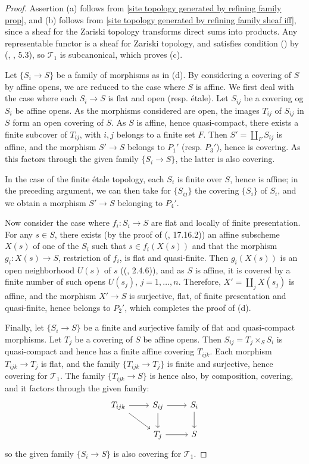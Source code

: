 \begin{proof}
Assertion (a) follows from \cref{site topology generated by refining family prop}, and (b) follows from \cref{site topology generated by refining family sheaf iff}, since a sheaf for the Zariski topology transforms direct sums into products. Any representable functor is a sheaf for Zariski topology, and satisfies condition () by (\cite{SGA1}, , 5.3), so $\mathcal{T}_1$ is subcanonical, which proves (c).\par
Let $\{S_i\to S\}$ be a family of morphisms as in (d). By considering a covering of $S$ by affine opens, we are reduced to the case where $S$ is affine. We first deal with the case where each $S_i\to S$ is flat and open (resp. \'etale). Let $S_{ij}$ be a covering og $S_i$ be affine opens. As the morphisms considered are open, the images $T_{ij}$ of $S_{ij}$ in $S$ form an open covering of $S$. As $S$ is affine, hence quasi-compact, there exists a finite subcover of $T_{ij}$, with $i,j$ belongs to a finite set $F$. Then $S'=\coprod_FS_{ij}$ is affine, and the morphism $S'\to S$ belongs to $P_1'$ (resp. $P_3'$), hence is covering. As this factors through the given family $\{S_i\to S\}$, the latter is also covering.\par
In the case of the finite \'etale topology, each $S_i$ is finite over $S$, hence is affine; in the preceding argument, we can then take for $\{S_{ij}\}$ the covering $\{S_i\}$ of $S_i$, and we obtain a morphism $S'\to S$ belonging to $P_4'$.\par
Now consider the case where $f_i:S_i\to S$ are flat and locally of finite presentation. For any $s\in S$, there exists (by the proof of (\cite{EGA4-4}, 17.16.2)) an affine subscheme $X(s)$ of one of the $S_i$ such that $s\in f_i(X(s))$ and that the morphism $g_i:X(s)\to S$, restriction of $f_i$, is flat and quasi-finite. Then $g_i(X(s))$ is an open neighborhood $U(s)$ of $s$ ((\cite{EGA4-2}, 2.4.6)), and as $S$ is affine, it is covered by a finite number of such opens $U(s_j)$, $j=1,\dots,n$. Therefore, $X'=\coprod_jX(s_j)$ is affine, and the morphism $X'\to S$ is surjective, flat, of finite presentation and quasi-finite, hence belongs to $P_2'$, which completes the proof of (d).\par
Finally, let $\{S_i\to S\}$ be a finite and surjective family of flat and quasi-compact morphisms. Let $T_j$ be a covering of $S$ be affine opens. Then $S_{ij}=T_j\times_SS_i$ is quasi-compact and hence has a finite affine covering $T_{ijk}$. Each morphism $T_{ijk}\to T_j$ is flat, and the family $\{T_{ijk}\to T_j\}$ is finite and surjective, hence covering for $\mathcal{T}_1$. The family $\{T_{ijk}\to S\}$ is hence also, by composition, covering, and it factors through the given family:
\[\begin{tikzcd}
T_{ijk}\ar[rd]\ar[r]&S_{ij}\ar[d]\ar[r]&S_i\ar[d]\\
&T_j\ar[r]&S
\end{tikzcd}\]
so the given family $\{S_i\to S\}$ is also covering for $\mathcal{T}_1$.
\end{proof}

